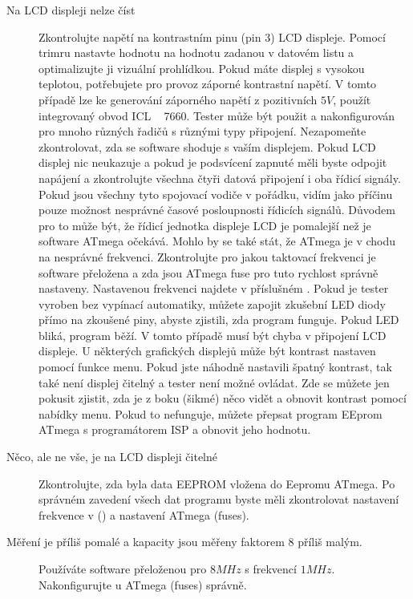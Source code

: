 \begin{description}
\item[Na LCD displeji nelze číst] 
Zkontrolujte napětí na kontrastním pinu (pin 3) LCD displeje.
Pomocí trimru nastavte hodnotu na hodnotu zadanou v datovém listu a optimalizujte ji
vizuální prohlídkou.
Pokud máte displej s vysokou teplotou, potřebujete pro provoz záporné kontrastní napětí.
V tomto případě lze ke generování záporného napětí z pozitivních \(5V\), použít integrovaný obvod ICL ~ 7660.
Tester může být použit a nakonfigurován pro mnoho různých řadičů s různými typy připojení.
Nezapomeňte zkontrolovat, zda se software shoduje s vaším displejem.
Pokud LCD displej nic neukazuje a pokud je podsvícení zapnuté
měli byste odpojit napájení a zkontrolujte všechna čtyři datová připojení i oba řídicí signály.
Pokud jsou všechny tyto spojovací vodiče v pořádku, vidím jako příčinu pouze možnost nesprávné
časové posloupnosti řídicích signálů.
Důvodem pro to může být, že řídicí jednotka displeje LCD je pomalejší než je software ATmega očekává.
Mohlo by se také stát, že ATmega je v chodu na nesprávné frekvenci.
Zkontrolujte pro jakou taktovací frekvenci je software přeložena a zda jsou ATmega fuse pro
tuto rychlost správně nastaveny.
Nastavenou frekvenci najdete v příslušném .
Pokud je tester vyroben bez vypínací automatiky, můžete zapojit zkušební LED diody přímo na
zkoušené piny, abyste zjistili, zda program funguje.
Pokud LED bliká, program běží. V tomto případě musí být chyba v připojení LCD displeje.
 U některých grafických displejů může být kontrast nastaven pomocí funkce menu.
Pokud jste náhodně nastavili špatný kontrast, tak také není displej čitelný a tester není možné
ovládat.
Zde se můžete jen pokusit zjistit, zda je z boku (šikmé) něco vidět a obnovit kontrast pomocí
nabídky menu. Pokud to nefunguje, můžete přepsat program EEprom ATmega s programátorem ISP a obnovit jeho hodnotu.

\item[Něco, ale ne vše, je na LCD displeji čitelné] 
Zkontrolujte, zda byla data EEPROM vložena do Eepromu ATmega.
Po správném zavedení všech dat programu byste měli zkontrolovat nastavení frekvence v ()
a nastavení ATmega (fuses).

\item[Měření je příliš pomalé a kapacity jsou měřeny faktorem 8 příliš malým.] 
Používáte software přeloženou pro \(8MHz\) s frekvencí \(1MHz\).
Nakonfigurujte u ATmega (fuses) správně.


\end{description}

